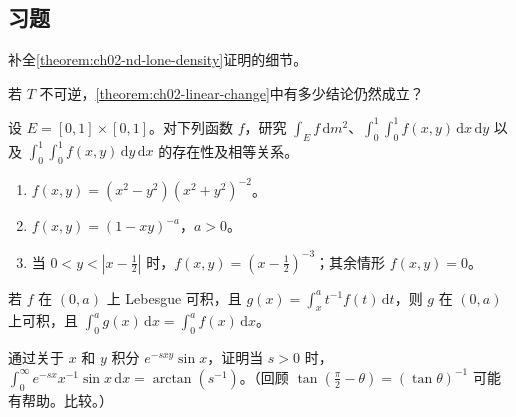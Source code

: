 \documentclass[../../main.tex]{subfiles}%
\begin{document}
\subsection*{习题}
\begin{exercise}\label{exercise:ch02-nd-density-proof}
补全\cref{theorem:ch02-nd-lone-density}证明的细节。
\end{exercise}
\begin{exercise}\label{exercise:ch02-singular-linear-change}
若 $T$ 不可逆，\cref{theorem:ch02-linear-change}中有多少结论仍然成立？
\end{exercise}
\begin{exercise}\label{exercise:ch02-iterated-integral-examples}
设 $E=[0,1]\times[0,1]$。对下列函数 $f$，研究 $\int_E f\,\mathrm{d}m^2$、$\int_0^1\int_0^1 f(x,y)\,\mathrm{d}x\,\mathrm{d}y$ 以及 $\int_0^1\int_0^1 f(x,y)\,\mathrm{d}y\,\mathrm{d}x$ 的存在性及相等关系。
\begin{enumerate}
\item\label{item:ch02-iterated-rational-example} $f(x,y)=(x^2-y^2)(x^2+y^2)^{-2}$。
\item\label{item:ch02-iterated-power-example} $f(x,y)=(1-xy)^{-a}$，$a>0$。
\item\label{item:ch02-iterated-strip-example} 当 $0<y<|x-\frac12|$ 时，$f(x,y)=(x-\frac12)^{-3}$；其余情形 $f(x,y)=0$。
\end{enumerate}
\end{exercise}
\begin{exercise}\label{exercise:ch02-integral-tail-average}
若 $f$ 在 $(0,a)$ 上 Lebesgue 可积，且 $g(x)=\int_x^a t^{-1}f(t)\,\mathrm{d}t$，则 $g$ 在 $(0,a)$ 上可积，且 $\int_0^a g(x)\,\mathrm{d}x=\int_0^a f(x)\,\mathrm{d}x$。
\end{exercise}
\begin{exercise}\label{exercise:ch02-laplace-sine-fubini}
通过关于 $x$ 和 $y$ 积分 $e^{-sxy}\sin x$，证明当 $s>0$ 时，$\int_0^\infty e^{-sx}x^{-1}\sin x\,\mathrm{d}x=\arctan(s^{-1})$。（回顾 $\tan(\frac\pi2-\theta)=(\tan\theta)^{-1}$ 可能有帮助。比较。）
\end{exercise}
\end{document}
